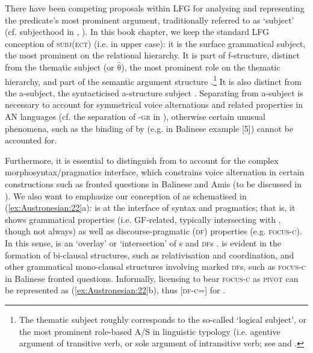 \documentclass[output=paper,chinesefont]{../langscibook}
\begin{document}
There have been competing proposals within LFG for analysing and representing the predicate's most prominent argument, traditionally referred to as `subject' (cf. subjecthood in \citealt{falk06}, ). In this book chapter, we keep the standard LFG conception of \textsc{subj(ect)} (i.e. in upper case): it is the surface grammatical subject, the most prominent \GF on the relational \GF hierarchy. It is part of f-structure, distinct from the thematic subject (or $\widehat{\mbox{θ}}$), the most prominent role on the thematic hierarchy, and part of the semantic argument structure \citep{bresnan1989locative,BresnanKanerva1992}.\footnote{The thematic subject roughly corresponds to the so-called `logical subject', or the most prominent role-based A/S in linguistic typology (i.e. agentive argument of transitive verb, or sole argument of intransitive verb; see \citet{Jespersen1924} and \citet[7]{Manning1994}.} It is also distinct from the a-subject, the syntacticised a-structure subject \citep{Manning1994}. Separating \SUBJ from a-subject is necessary to account for symmetrical voice alternations and related properties in AN languages (cf. the separation of \GF-\textsc{gr} in ), otherwise certain unusual phenomena, such as the binding of \SUBJ by \OBJ (e.g. in Balinese example [5]) cannot be accounted for.

Furthermore, it is essential to distinguish \SUBJ from \PIVOT to account for the complex morphosyntax/pragmatics interface, which constrains voice alternation in certain constructions such as fronted questions in Balinese and Amis (to be discussed in ). We also want to emphasize our conception of \PIVOT as schematised in (\ref{ex:Austronesian:22}a): \PIVOT is at the interface of syntax and pragmatics; that is, it shows grammatical properties (i.e. GF-related, typically intersecting with \SUBJ, though not always) as well as discourse-pragmatic (\textsc{df}) properties (e.g. \textsc{focus-c}). In this sense, \PIVOT is an `overlay' or `intersection' of {\GF}s and \textsc{df}s \citep{Arka2021}. \PIVOT is evident in the formation of bi-clausal structures, such as relativisation and coordination, and other grammatical mono-clausal structures involving marked \textsc{df}s, such as \textsc{focus-c} in Balinese fronted questions. Informally, licensing \SUBJ to bear \textsc{focus-c} as \textsc{piv\-ot} can be represented as (\ref{ex:Austronesian:22}b), thus \mbox{[\textsc{df-c}={\SUBJ}]\;\PIVOT} for \SUBJ\PIVOT.
\end{document}
